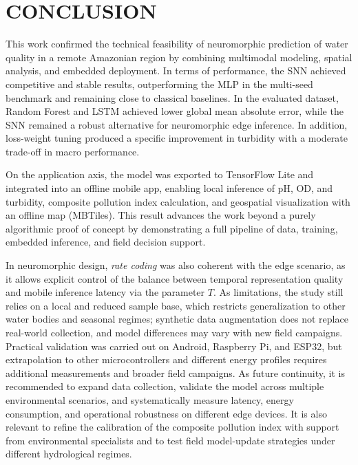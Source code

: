 \section{CONCLUSION}

This work confirmed the technical feasibility of neuromorphic prediction of water quality in a
remote Amazonian region by combining multimodal modeling, spatial analysis, and embedded deployment. In
terms of performance, the SNN achieved competitive and stable results, outperforming the MLP in
the multi-seed benchmark and remaining close to classical baselines. In the evaluated dataset,
Random Forest and LSTM achieved lower global mean absolute error, while the SNN remained a robust
alternative for neuromorphic edge inference. In addition, loss-weight tuning produced a specific
improvement in turbidity with a moderate trade-off in macro performance.

On the application axis, the model was exported to TensorFlow Lite and integrated into an offline
mobile app, enabling local inference of pH, OD, and turbidity, composite pollution index
calculation, and geospatial visualization with an offline map (MBTiles). This result advances
the work beyond a purely algorithmic proof of concept by demonstrating a full pipeline of data,
training, embedded inference, and field decision support.

In neuromorphic design, \textit{rate coding} was also coherent with the edge scenario, as it
allows explicit control of the balance between temporal representation quality and mobile
inference latency via the parameter $T$. As limitations, the study still relies on a local and
reduced sample base, which restricts generalization to other water bodies and seasonal regimes;
synthetic data augmentation does not replace real-world collection, and model differences may
vary with new field campaigns. Practical validation was carried out on Android, Raspberry Pi,
and ESP32, but extrapolation to other microcontrollers and different energy profiles requires
additional measurements and broader field campaigns. As future continuity, it is recommended to
expand data collection, validate the model across multiple environmental scenarios, and
systematically measure latency, energy consumption, and operational robustness on different edge
devices. It is also relevant to refine the calibration of the composite pollution index with
support from environmental specialists and to test field model-update strategies under different
hydrological regimes.

